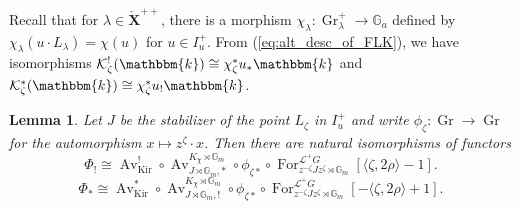 \documentclass{amsart}
\renewcommand{\L}{\mathcal{L}}
\newcommand{\G}{\mathbb{G}}
\renewcommand{\k}{\mathbbm{k}}
\newcommand{\scrK}{\mathcal{K}}
\newcommand{\bfXv}{\check{\mathbf{X}}}
\DeclareMathOperator{\Av}{Av}
\DeclareMathOperator{\For}{For}
\DeclareMathOperator{\Gr}{Gr}
\DeclareMathOperator{\Kir}{Kir}
\newtheorem{lemma}[subsubsection]{Lemma}
\theoremstyle{definition}
\begin{document}
    Recall that for $\lambda \in \bfXv^{++}$, there is a morphism $\chi_{\lambda} : \Gr_{\lambda}^+ \to \G_a$ defined by $\chi_{\lambda} (u \cdot L_{\lambda}) = \chi (u)$ for $u \in I_u^+$.
    From (\ref{eq:alt_desc_of_FLK}), we have isomorphisms $\scrK_{\zeta}^! (\k) \cong \chi_{\zeta}^* u_* \k$ and $\scrK_{\zeta}^* (\k) \cong \chi_{\zeta}^* u_! \k$.

    \begin{lemma}\label{lem:desc_of_Phi}
        Let $J$ be the stabilizer of the point $L_{\zeta}$ in $I_u^+$ and write $\phi_{\zeta} : \Gr \to \Gr$ for the automorphism $x \mapsto z^{\zeta} \cdot x$.
        Then there are natural isomorphisms of functors
        \[\Phi_! \cong \Av_{\Kir}^! \circ \Av_{J \rtimes \G_m, *}^{K_{\chi} \rtimes \G_m} \circ \phi_{\zeta *} \circ \For^{\L^+ G}_{z^{-\zeta} J z^{\zeta} \rtimes \G_m} [\langle \zeta, 2\rho \rangle - 1].\]        
        \[\Phi_* \cong \Av_{\Kir}^* \circ \Av_{J \rtimes \G_m, !}^{K_{\chi} \rtimes \G_m} \circ \phi_{\zeta *} \circ \For^{\L^+ G}_{z^{-\zeta} J z^{\zeta} \rtimes \G_m} [-\langle \zeta, 2\rho \rangle + 1].\]        
    \end{lemma}
\end{document}
